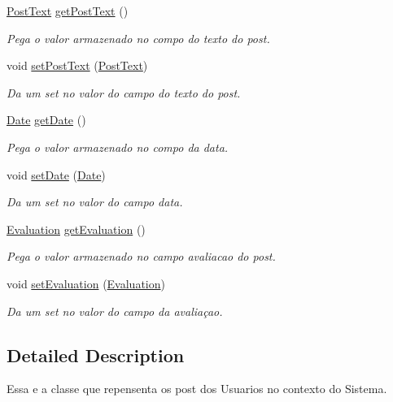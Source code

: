 \begin{DoxyCompactItemize}
\hyperlink{class_post_text}{Post\-Text} \hyperlink{class_post_ab9ea6345952d8f7436aebb10e73b5545}{get\-Post\-Text} ()
\begin{DoxyCompactList}\small\item\em Pega o valor armazenado no compo do texto do post. \end{DoxyCompactList}\item 
void \hyperlink{class_post_a707c32c73737cf886f32f733af58f851}{set\-Post\-Text} (\hyperlink{class_post_text}{Post\-Text})
\begin{DoxyCompactList}\small\item\em Da um set no valor do campo do texto do post. \end{DoxyCompactList}\item 
\hyperlink{class_date}{Date} \hyperlink{class_post_a66926dfefe3d5b0cc127506719eb8732}{get\-Date} ()
\begin{DoxyCompactList}\small\item\em Pega o valor armazenado no compo da data. \end{DoxyCompactList}\item 
void \hyperlink{class_post_a6476486ac78e6eb2c3eb950a3fba9de1}{set\-Date} (\hyperlink{class_date}{Date})
\begin{DoxyCompactList}\small\item\em Da um set no valor do campo data. \end{DoxyCompactList}\item 
\hyperlink{class_evaluation}{Evaluation} \hyperlink{class_post_ab41c4b25e8256cc820f6805f06eb7dba}{get\-Evaluation} ()
\begin{DoxyCompactList}\small\item\em Pega o valor armazenado no campo avaliacao do post. \end{DoxyCompactList}\item 
void \hyperlink{class_post_adaf2ae8bd4bc4d7981b2f7704b2603a0}{set\-Evaluation} (\hyperlink{class_evaluation}{Evaluation})
\begin{DoxyCompactList}\small\item\em Da um set no valor do campo da avaliaçao. \end{DoxyCompactList}\end{DoxyCompactItemize}


\subsection{Detailed Description}
Essa e a classe que repensenta os post dos Usuarios no contexto do Sistema. 

